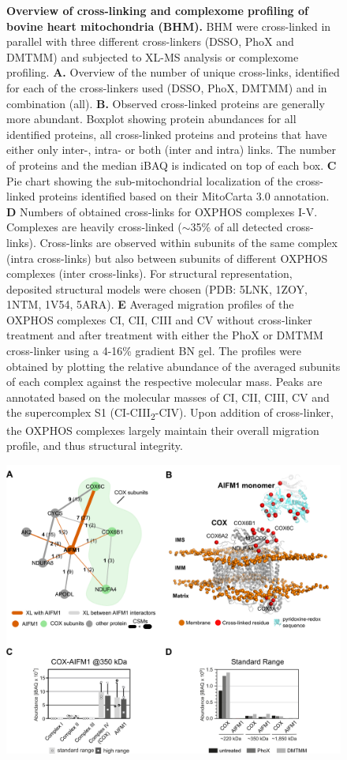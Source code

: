 \begin{subappendices}
\begin{figure}[ht!]
        \caption{\textbf{Overview of cross-linking and complexome profiling of bovine heart mitochondria (BHM).} BHM were cross-linked in parallel with three different cross-linkers (DSSO, PhoX and DMTMM) and subjected to XL-MS analysis or complexome profiling. \textbf{A.} Overview of the number of unique cross-links, identified for each of the cross-linkers used (DSSO, PhoX, DMTMM) and in combination (all). \textbf{B.} Observed cross-linked proteins are generally more abundant. Boxplot showing protein abundances for all identified proteins, all cross-linked proteins and proteins that have either only inter-, intra- or both (inter and intra) links. The number of proteins and the median iBAQ is indicated on top of each box. \textbf{C} Pie chart showing the sub-mitochondrial localization of the cross-linked proteins identified based on their MitoCarta 3.0 annotation. \textbf{D} Numbers of obtained cross-links for OXPHOS complexes I-V. Complexes are heavily cross-linked ($\sim$35\% of all detected cross-links). Cross-links are observed within subunits of the same complex (intra cross-links) but also between subunits of different OXPHOS complexes (inter cross-links). For structural representation, deposited structural models were chosen (PDB: 5LNK, 1ZOY, 1NTM, 1V54, 5ARA). \textbf{E} Averaged migration profiles of the OXPHOS complexes CI, CII, CIII and CV without cross-linker treatment and after treatment with either the PhoX or DMTMM cross-linker using a 4-16\% gradient BN gel. The profiles were obtained by plotting the relative abundance of the averaged subunits of each complex against the respective molecular mass. Peaks are annotated based on the molecular masses of CI, CII, CIII, CV and the supercomplex S1 (CI-CIII\textsubscript{2}-CIV). Upon addition of cross-linker, the OXPHOS complexes largely maintain their overall migration profile, and thus structural integrity.}
    \end{figure}
    \begin{figure}[htb]
        \center
        \includegraphics[]{Chapter.3/Figures/SI_Figure2.png}

\end{figure}
\end{subappendices}
